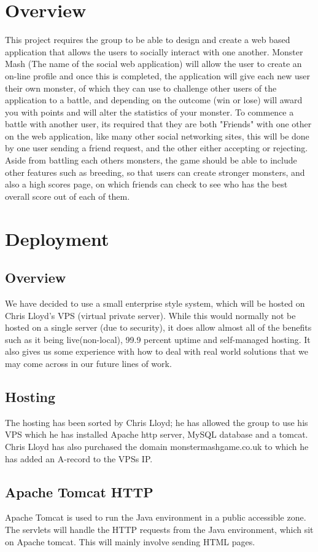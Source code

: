 \documentclass{project}
\begin{document}
\section{Overview}
This project requires the group to be able to design and create a web based application
that allows the users to socially interact with one another. Monster Mash (The
name of the social web application) will allow the user to create an on-line profile and
once this is completed, the application will give each new user their own monster,
of which they can use to challenge other users of the application to a battle, and
depending on the outcome (win or lose) will award you with points and will alter
the statistics of your monster.
To commence a battle with another user, its required that they are both "Friends"
with one other on the web application, like many other social networking sites, this
will be done by one user sending a friend request, and the other either accepting or
rejecting.
Aside from battling each others monsters, the game should be able to include other
features such as breeding, so that users can create stronger monsters, and also a
high scores page, on which friends can check to see who has the best overall score
out of each of them.
\section{Deployment}
\subsection{Overview}
We have decided to use a small enterprise style system, which will be hosted on
Chris Lloyd's VPS (virtual private server). While this would normally not be hosted
on a single server (due to security), it does allow almost all of the benefits such as it
being live(non-local), 99.9 percent uptime and self-managed hosting. It also gives us some
experience with how to deal with real world solutions that we may come across in
our future lines of work.

\subsection{Hosting}
The hosting has been sorted by Chris Lloyd; he has allowed the group to use his
VPS which he has installed Apache http server, MySQL database and a tomcat.
Chris Lloyd has also purchased the domain monstermashgame.co.uk to which he
has added an A-record to the VPSs IP.

\subsection{Apache Tomcat HTTP}
Apache Tomcat is used to run the Java environment in a public accessible zone. The servlets will handle the HTTP requests from the Java environment, which sit on Apache tomcat. This will mainly involve sending HTML pages.
\end{document}
